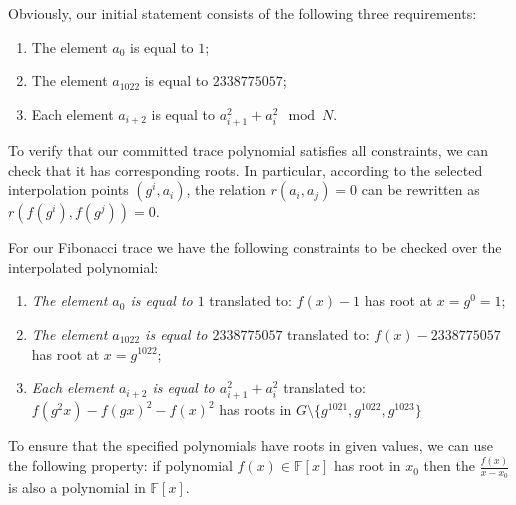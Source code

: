 \documentclass[../lecture-notes.tex]{subfiles}
\begin{document}
\begin{example}
Obviously, our initial statement consists of the following three requirements:
\begin{enumerate}
    \item The element $a_0$ is equal to $1$;
    \item The element $a_{1022}$ is equal to $2338775057$;
    \item Each element $a_{i+2}$ is equal to $a_{i+1}^2 + a_{i}^2 \mod N$.
\end{enumerate}
\end{example}
To verify that our committed trace polynomial satisfies all constraints, we can check that it has corresponding roots. In particular, according to the selected interpolation points $(g^i, a_i)$, the relation $r(a_i, a_j) = 0$ can be rewritten as $r(f(g^i), f(g^j)) = 0$.
\begin{example}
For our Fibonacci trace we have the following constraints to be checked over the interpolated polynomial:
\begin{enumerate}
    \item \textit{The element $a_0$ is equal to $1$} translated to: $f(x)-1$ has root at $x = g^0 = 1$;
    \item \textit{The element $a_{1022}$ is equal to $2338775057$} translated to: $f(x) - 2338775057$ has root at $x = g^{1022}$;
    \item \textit{Each element $a_{i+2}$ is equal to $a_{i+1}^2 + a_{i}^2$} translated to: $f(g^2x) - f(gx)^2 - f(x)^2$ has roots in $G \setminus \{g^{1021}, g^{1022}, g^{1023}\}$
\end{enumerate}
\end{example}

To ensure that the specified polynomials have roots in given values, we can use the following property: if polynomial $f(x) \in \mathbb{F}[x]$ has root in $x_0$ then the $\frac{f(x)}{x - x_0}$ is also a polynomial in $\mathbb{F}[x]$.
\end{document}
